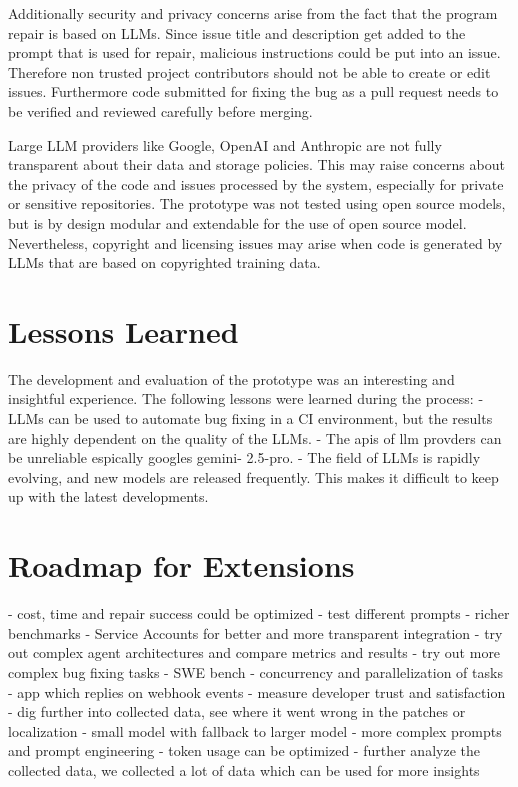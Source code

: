 Additionally security and privacy concerns arise from the fact that the program repair is based on LLMs. Since issue title and description get added to the prompt that is used for repair, malicious instructions could be put into an issue. Therefore non trusted project contributors should not be able to create or edit issues. Furthermore code submitted for fixing the bug as a pull request needs to be verified and reviewed carefully before merging.

Large LLM providers like Google, OpenAI and Anthropic are not fully transparent about their data and storage policies. This may raise concerns about the privacy of the code and issues processed by the system, especially for private or sensitive repositories. The prototype was not tested using open source models, but is by design modular and  extendable for the use of open source model. Nevertheless, copyright and licensing issues may arise when code is generated by LLMs that are based on copyrighted training data. \cite{sauvolaFutureSoftwareDevelopment2024, houLargeLanguageModels2024}


\section{Lessons Learned}
The development and evaluation of the prototype was an interesting and insightful experience. The following lessons were learned during the process:
- LLMs can be used to automate bug fixing in a CI environment, but the results are highly dependent on the quality of the LLMs.
- The apis of llm provders can be unreliable espically googles gemini- 2.5-pro.
- The field of LLMs is rapidly evolving, and new models are released frequently. This makes it difficult to keep up with the latest developments.


\section{Roadmap for Extensions} \label{section:roadmap}
- cost, time and repair success could be optimized 
- test different prompts 
- richer benchmarks
- Service Accounts for better and more transparent integration
- try out complex agent architectures and compare metrics and results
- try out more complex bug fixing tasks - SWE bench
- concurrency and parallelization of tasks
- app which replies on webhook events
- measure developer trust and satisfaction
- dig further into collected data, see where it went wrong in the patches or localization
- small model with fallback to larger model
- more complex prompts and prompt engineering
- token usage can be optimized
- further analyze the collected data, we collected a lot of data which can be used for more insights